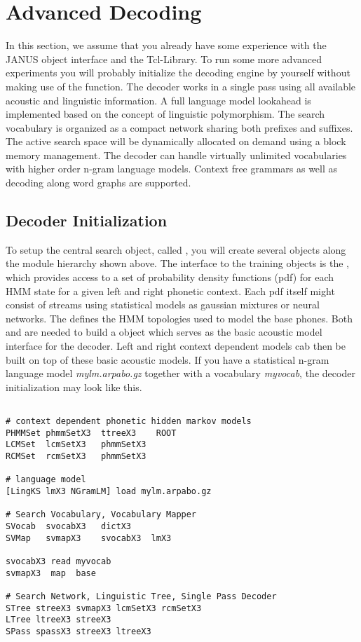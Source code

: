 \section{Advanced Decoding} \label{ibis:advanced}

In this section, we assume that you  already have some experience with
the JANUS object  interface  and the  Tcl-Library.  To run  some  more
advanced experiments you will  probably initialize the  decoding engine
by   yourself  without  making   use   of  the   
function.  The  decoder works  in  a  single  pass using all available
acoustic and linguistic information.  A full language  model lookahead
is implemented  based on the  concept of linguistic polymorphism.  The
search   vocabulary  is organized as   a  compact network sharing both
prefixes  and  suffixes. The active search   space will be dynamically
allocated  on demand using a  block memory management. The decoder can
handle virtually unlimited   vocabularies with  higher order    n-gram
language models. Context free grammars as  well as decoding along word
graphs are supported.


\subsection{Decoder Initialization}

To  setup the central  search object, called , you
will   create several objects     along  the module  hierarchy   shown
above. The     interface      to the   training    objects      is the
,  which provides    access   to  a set     of
probability density  functions (pdf) for  each HMM state for a given
left  and  right phonetic context.   Each pdf  itself might consist of
streams  using statistical models  as    gaussian mixtures or   neural
networks.  The   defines the HMM topologies used
to   model   the    base phones.  Both      and
  are needed  to  build a 
object which  serves  as the basic acoustic  model  interface for  the
decoder. Left and right context dependent models cab  then be built on
top  of these basic  acoustic  models.  If you   have a statistical n-gram
language model {\em  mylm.arpabo.gz} together  with a vocabulary  {\em
myvocab}, the decoder initialization may look like this.

\begin{verbatim}

# context dependent phonetic hidden markov models
PHMMSet phmmSetX3  ttreeX3    ROOT
LCMSet  lcmSetX3   phmmSetX3
RCMSet  rcmSetX3   phmmSetX3

# language model
[LingKS lmX3 NGramLM] load mylm.arpabo.gz

# Search Vocabulary, Vocabulary Mapper
SVocab  svocabX3   dictX3
SVMap   svmapX3    svocabX3  lmX3

svocabX3 read myvocab
svmapX3  map  base

# Search Network, Linguistic Tree, Single Pass Decoder
STree streeX3 svmapX3 lcmSetX3 rcmSetX3 
LTree ltreeX3 streeX3 
SPass spassX3 streeX3 ltreeX3

\end{verbatim}

